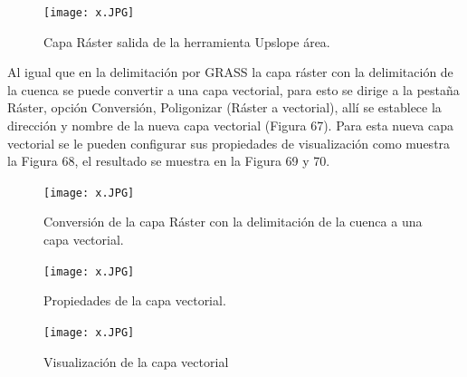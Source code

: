 \documentclass[12pt,hidelinks]{article}
\begin{document}
\begin{figure}[H]
    \centering
    \texttt{[image: x.JPG]}
    \caption{Capa Ráster salida de la herramienta Upslope área. }
 \label{fig:my_label}
\end{figure}
Al igual que en la delimitación por GRASS la capa ráster con la delimitación de la cuenca se puede convertir a una capa vectorial, para esto se dirige a la pestaña Ráster, opción Conversión, Poligonizar (Ráster a vectorial), allí se establece la dirección y nombre de la nueva capa vectorial (Figura 67). Para esta nueva capa vectorial se le pueden configurar sus propiedades de visualización como muestra la Figura 68, el resultado se muestra en la Figura 69 y 70.
\begin{figure}[H]
    \centering
    \texttt{[image: x.JPG]}
    \caption{Conversión de la capa Ráster con la delimitación de la cuenca a una capa vectorial. }
 \label{fig:my_label}
\end{figure}
\begin{figure}[H]
    \centering
    \texttt{[image: x.JPG]}
    \caption{Propiedades de la capa vectorial. }
 \label{fig:my_label}
\end{figure}
\begin{figure}[H]
    \centering
    \texttt{[image: x.JPG]}
    \caption{Visualización de la capa vectorial }
 \label{fig:my_label}
\end{figure}
\end{document}
